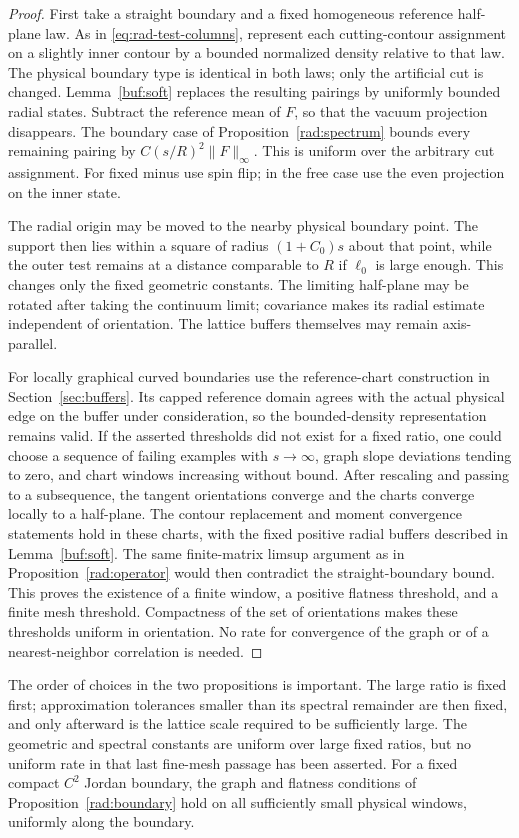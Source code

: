 \begin{proof}
First take a straight boundary and a fixed homogeneous reference
half-plane law.  As in \eqref{eq:rad-test-columns}, represent each
cutting-contour assignment on a slightly inner contour by a
bounded normalized density relative to that law.  The physical
boundary type is identical in both laws; only the artificial cut
is changed.  Lemma~\ref{buf:soft} replaces the resulting pairings
by uniformly bounded radial states.  Subtract the reference mean
of $F$, so that the vacuum projection disappears.  The boundary
case of Proposition~\ref{rad:spectrum} bounds every remaining
pairing by $C(s/R)^2\|F\|_\infty$.  This is uniform over the
arbitrary cut assignment.  For fixed minus use spin flip; in the
free case use the even projection on the inner state.

The radial origin may be moved to the nearby physical boundary
point.  The support then lies within a square of radius
$(1+C_0)s$ about that point, while the outer test remains at a
distance comparable to $R$ if $\ell_0$ is large enough.
This changes only the fixed geometric constants.  The limiting
half-plane may be rotated after taking the continuum limit;
covariance makes its radial estimate independent of orientation.
The lattice buffers themselves may remain axis-parallel.

For locally graphical curved boundaries use the reference-chart
construction in Section~\ref{sec:buffers}.  Its capped reference
domain agrees with the actual physical edge on the buffer under
consideration, so the bounded-density representation remains
valid.  If the asserted thresholds did not exist for a fixed
ratio, one could choose a sequence of failing examples with
$s\to\infty$, graph slope deviations tending to zero, and chart
windows increasing without bound.  After rescaling and passing
to a subsequence, the tangent orientations converge and the
charts converge locally to a half-plane.  The contour
replacement and moment convergence statements hold in these
charts, with the fixed positive radial buffers described in
Lemma~\ref{buf:soft}.  The same finite-matrix limsup argument as
in Proposition~\ref{rad:operator} would then contradict the
straight-boundary bound.  This proves the existence of a finite
window, a positive flatness threshold, and a finite mesh
threshold.  Compactness of the set of orientations makes these
thresholds uniform in orientation.  No rate for convergence of
the graph or of a nearest-neighbor correlation is needed.
\end{proof}

\begin{remark}
The order of choices in the two propositions is important.  The
large ratio is fixed first; approximation tolerances smaller than
its spectral remainder are then fixed, and only afterward is the
lattice scale required to be sufficiently large.  The geometric
and spectral constants are uniform over large fixed ratios, but
no uniform rate in that last fine-mesh passage has been asserted.
For a fixed compact $C^2$ Jordan boundary, the graph and flatness
conditions of Proposition~\ref{rad:boundary} hold on all
sufficiently small physical windows, uniformly along the
boundary.
\end{remark}
